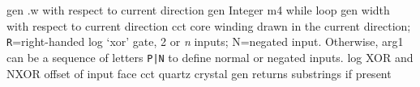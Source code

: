%
  {gen}
  {.w with respect to current direction}
  {gen}
  {Integer m4 while loop}
  {gen}
  {width with respect to current direction}
  {cct}
  {core winding drawn in the current direction; {\tt R}=right-handed
   }
  {log}
  {`xor' gate, 2 or {\sl n\/} inputs; N=negated input.
   Otherwise, arg1 can be a sequence of letters {\tt P|N}
   to define normal or negated inputs.
    }
  {log}
  {XOR and NXOR offset of input face}
%
  {cct}
  {quartz crystal}
  {gen}
  {returns substrings if present}
